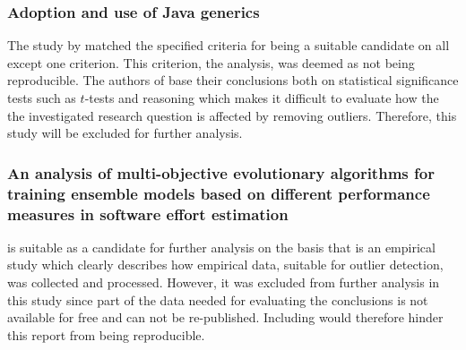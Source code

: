 \subsubsection{Adoption and use of Java generics}
The study by \citet{parnin2013adoption} matched the specified criteria for being a suitable candidate on all except one criterion. This criterion, the analysis, was deemed as not being reproducible. The authors of \citet{parnin2013adoption} base their conclusions both on statistical significance tests such as $t$-tests and reasoning which makes it difficult to evaluate how the the investigated research question is affected by removing outliers. Therefore, this study will be excluded for further analysis.


\subsubsection{An analysis of multi-objective evolutionary algorithms for training ensemble models based on different performance measures in software effort estimation}
\citet{minku2013analysis} is suitable as a candidate for further analysis on the basis that is an empirical study which clearly describes how empirical data, suitable for outlier detection, was collected and processed. However, it was excluded from further analysis in this study since part of the data needed for evaluating the conclusions is not available for free and can not be re-published. Including \citet{minku2013analysis} would therefore hinder this report from being reproducible.
